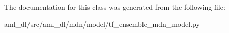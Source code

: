 The documentation for this class was generated from the following file\-:\begin{DoxyCompactItemize}
\item 
aml\-\_\-dl/src/aml\-\_\-dl/mdn/model/tf\-\_\-ensemble\-\_\-mdn\-\_\-model.\-py\end{DoxyCompactItemize}
